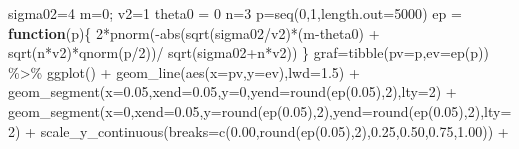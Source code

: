 \documentclass[
]{book}
\newenvironment{Shaded}{\begin{snugshade}}{\end{snugshade}}
\newcommand{\AttributeTok}[1]{\textcolor[rgb]{0.77,0.63,0.00}{#1}}
\newcommand{\ControlFlowTok}[1]{\textcolor[rgb]{0.13,0.29,0.53}{\textbf{#1}}}
\newcommand{\DecValTok}[1]{\textcolor[rgb]{0.00,0.00,0.81}{#1}}
\newcommand{\FloatTok}[1]{\textcolor[rgb]{0.00,0.00,0.81}{#1}}
\newcommand{\FunctionTok}[1]{\textcolor[rgb]{0.00,0.00,0.00}{#1}}
\newcommand{\NormalTok}[1]{#1}
\newcommand{\OtherTok}[1]{\textcolor[rgb]{0.56,0.35,0.01}{#1}}
\newcommand{\SpecialCharTok}[1]{\textcolor[rgb]{0.00,0.00,0.00}{#1}}
\begin{document}
\begin{Shaded}
\begin{Highlighting}[]
\NormalTok{sigma02}\OtherTok{=}\DecValTok{4}
\NormalTok{m}\OtherTok{=}\DecValTok{0}\NormalTok{; v2}\OtherTok{=}\DecValTok{1}
\NormalTok{theta0 }\OtherTok{=} \DecValTok{0}
\NormalTok{n}\OtherTok{=}\DecValTok{3}
\NormalTok{p}\OtherTok{=}\FunctionTok{seq}\NormalTok{(}\DecValTok{0}\NormalTok{,}\DecValTok{1}\NormalTok{,}\AttributeTok{length.out=}\DecValTok{5000}\NormalTok{)}
\NormalTok{ep }\OtherTok{=}  \ControlFlowTok{function}\NormalTok{(p)\{}
  \DecValTok{2}\SpecialCharTok{*}\FunctionTok{pnorm}\NormalTok{(}\SpecialCharTok{{-}}\FunctionTok{abs}\NormalTok{(}\FunctionTok{sqrt}\NormalTok{(sigma02}\SpecialCharTok{/}\NormalTok{v2)}\SpecialCharTok{*}\NormalTok{(m}\SpecialCharTok{{-}}\NormalTok{theta0) }\SpecialCharTok{+} \FunctionTok{sqrt}\NormalTok{(n}\SpecialCharTok{*}\NormalTok{v2)}\SpecialCharTok{*}\FunctionTok{qnorm}\NormalTok{(p}\SpecialCharTok{/}\DecValTok{2}\NormalTok{))}\SpecialCharTok{/} \FunctionTok{sqrt}\NormalTok{(sigma02}\SpecialCharTok{+}\NormalTok{n}\SpecialCharTok{*}\NormalTok{v2))}
\NormalTok{\}}
\NormalTok{graf}\OtherTok{=}\FunctionTok{tibble}\NormalTok{(}\AttributeTok{pv=}\NormalTok{p,}\AttributeTok{ev=}\FunctionTok{ep}\NormalTok{(p)) }\SpecialCharTok{\%\textgreater{}\%}
  \FunctionTok{ggplot}\NormalTok{() }\SpecialCharTok{+}
  \FunctionTok{geom\_line}\NormalTok{(}\FunctionTok{aes}\NormalTok{(}\AttributeTok{x=}\NormalTok{pv,}\AttributeTok{y=}\NormalTok{ev),}\AttributeTok{lwd=}\FloatTok{1.5}\NormalTok{) }\SpecialCharTok{+}
  \FunctionTok{geom\_segment}\NormalTok{(}\AttributeTok{x=}\FloatTok{0.05}\NormalTok{,}\AttributeTok{xend=}\FloatTok{0.05}\NormalTok{,}\AttributeTok{y=}\DecValTok{0}\NormalTok{,}\AttributeTok{yend=}\FunctionTok{round}\NormalTok{(}\FunctionTok{ep}\NormalTok{(}\FloatTok{0.05}\NormalTok{),}\DecValTok{2}\NormalTok{),}\AttributeTok{lty=}\DecValTok{2}\NormalTok{) }\SpecialCharTok{+}
  \FunctionTok{geom\_segment}\NormalTok{(}\AttributeTok{x=}\DecValTok{0}\NormalTok{,}\AttributeTok{xend=}\FloatTok{0.05}\NormalTok{,}\AttributeTok{y=}\FunctionTok{round}\NormalTok{(}\FunctionTok{ep}\NormalTok{(}\FloatTok{0.05}\NormalTok{),}\DecValTok{2}\NormalTok{),}\AttributeTok{yend=}\FunctionTok{round}\NormalTok{(}\FunctionTok{ep}\NormalTok{(}\FloatTok{0.05}\NormalTok{),}\DecValTok{2}\NormalTok{),}\AttributeTok{lty=}\DecValTok{2}\NormalTok{) }\SpecialCharTok{+}
  \FunctionTok{scale\_y\_continuous}\NormalTok{(}\AttributeTok{breaks=}\FunctionTok{c}\NormalTok{(}\FloatTok{0.00}\NormalTok{,}\FunctionTok{round}\NormalTok{(}\FunctionTok{ep}\NormalTok{(}\FloatTok{0.05}\NormalTok{),}\DecValTok{2}\NormalTok{),}\FloatTok{0.25}\NormalTok{,}\FloatTok{0.50}\NormalTok{,}\FloatTok{0.75}\NormalTok{,}\FloatTok{1.00}\NormalTok{)) }\SpecialCharTok{+}

\end{Highlighting}
\end{Shaded}
\end{document}
